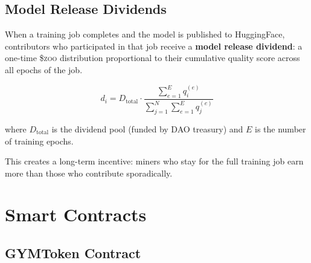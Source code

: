 \documentclass[11pt,letterpaper]{article}
\newcommand{\ZOO}{\$\textsc{zoo}}
\begin{document}
\subsection{Model Release Dividends}

When a training job completes and the model is published to HuggingFace, contributors who participated in that job receive a \textbf{model release dividend}: a one-time \ZOO{} distribution proportional to their cumulative quality score across all epochs of the job.

\begin{equation}
    d_i = D_{\text{total}} \cdot \frac{\sum_{e=1}^E q_i^{(e)}}{\sum_{j=1}^N \sum_{e=1}^E q_j^{(e)}}
\end{equation}

where $D_{\text{total}}$ is the dividend pool (funded by DAO treasury) and $E$ is the number of training epochs.

This creates a long-term incentive: miners who stay for the full training job earn more than those who contribute sporadically.

\section{Smart Contracts}
\label{sec:contracts}

\subsection{GYMToken Contract}
\end{document}
